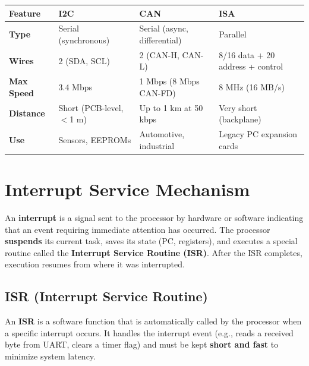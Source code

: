 \documentclass[12pt,a4paper]{article}
\renewcommand{\arraystretch}{1.45}
\begin{document}
\par\noindent
{\renewcommand{\arraystretch}{1.55}%
\begin{tabularx}{\linewidth}{|B{3.0cm}|Y|Y|Y|}
\hline
\textbf{Feature} & \textbf{I2C} & \textbf{CAN} & \textbf{ISA} \\
\hline
\textbf{Type} & Serial (synchronous) & Serial (async, differential) & Parallel \\
\hline
\textbf{Wires} & 2 (SDA, SCL) & 2 (CAN-H, CAN-L) & 8/16 data + 20 address + control \\
\hline
\textbf{Max Speed} & 3.4 Mbps & 1 Mbps (8 Mbps CAN-FD) & 8 MHz (16 MB/s) \\
\hline
\textbf{Distance} & Short (PCB-level, $<$1 m) & Up to 1 km at 50 kbps & Very short (backplane) \\
\hline
\textbf{Use} & Sensors, EEPROMs & Automotive, industrial & Legacy PC expansion cards \\
\hline
\end{tabularx}}

\section{Interrupt Service Mechanism}

\begin{tcolorbox}[defbox, title={\textbf{Interrupt}}]
An \textbf{interrupt} is a signal sent to the processor by hardware or software indicating that an event requiring immediate attention has occurred. The processor \textbf{suspends} its current task, saves its state (PC, registers), and executes a special routine called the \textbf{Interrupt Service Routine (ISR)}. After the ISR completes, execution resumes from where it was interrupted.
\end{tcolorbox}

\subsection{ISR (Interrupt Service Routine)}

\begin{tcolorbox}[defbox, title={\textbf{ISR --- Interrupt Service Routine}}]
An \textbf{ISR} is a software function that is automatically called by the processor when a specific interrupt occurs. It handles the interrupt event (e.g., reads a received byte from UART, clears a timer flag) and must be kept \textbf{short and fast} to minimize system latency.
\end{tcolorbox}
\end{document}
